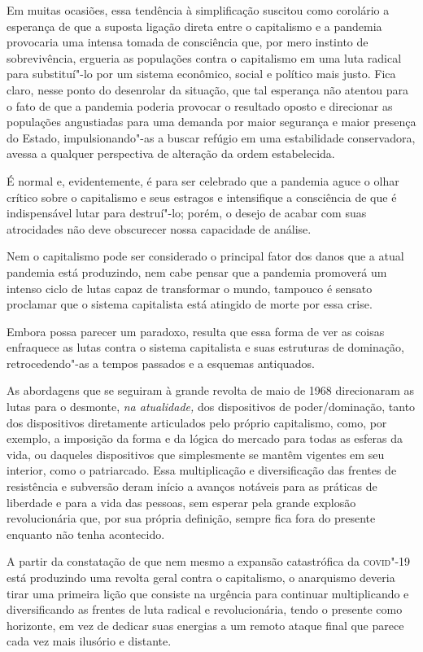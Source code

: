 Em muitas ocasiões, essa tendência à simplificação suscitou como
corolário a esperança de que a suposta ligação direta entre o
capitalismo e a pandemia provocaria uma intensa tomada de consciência
que, por mero instinto de sobrevivência, ergueria as populações contra o
capitalismo em uma luta radical para substituí"-lo por um sistema
econômico, social e político mais justo. Fica claro, nesse ponto do
desenrolar da situação, que tal esperança não atentou para o fato de que
a pandemia poderia provocar o resultado oposto e direcionar as
populações angustiadas para uma demanda por maior segurança e maior
presença do Estado, impulsionando"-as a buscar refúgio em uma
estabilidade conservadora, avessa a qualquer perspectiva de alteração da
ordem estabelecida.

É normal e, evidentemente, é para ser celebrado que a pandemia aguce o
olhar crítico sobre o capitalismo e seus estragos e intensifique a
consciência de que é indispensável lutar para destruí"-lo; porém, o
desejo de acabar com suas atrocidades não deve obscurecer nossa
capacidade de análise.

Nem o capitalismo pode ser considerado o principal fator dos danos que a
atual pandemia está produzindo, nem cabe pensar que a pandemia promoverá
um intenso ciclo de lutas capaz de transformar o mundo, tampouco é
sensato proclamar que o sistema capitalista está atingido de morte por
essa crise.

Embora possa parecer um paradoxo, resulta que essa forma de ver as
coisas enfraquece as lutas contra o sistema capitalista e suas
estruturas de dominação, retrocedendo"-as a tempos passados e a esquemas
antiquados.

As abordagens que se seguiram à grande revolta de maio de 1968
direcionaram as lutas para o desmonte, \textit{na atualidade,} dos
dispositivos de poder/dominação, tanto dos dispositivos diretamente
articulados pelo próprio capitalismo, como, por exemplo, a imposição da
forma e da lógica do mercado para todas as esferas da vida, ou daqueles
dispositivos que simplesmente se mantêm vigentes em seu interior, como o
patriarcado. Essa multiplicação e diversificação das frentes de
resistência e subversão deram início a avanços notáveis para as práticas
de liberdade e para a vida das pessoas, sem esperar pela grande explosão
revolucionária que, por sua própria definição, sempre fica fora do
presente enquanto não tenha acontecido.

A partir da constatação de que nem mesmo a expansão catastrófica da
\textsc{covid}"-19 está produzindo uma revolta geral contra o capitalismo, o
anarquismo deveria tirar uma primeira lição que
consiste na urgência para
continuar multiplicando e diversificando as frentes de luta radical e
revolucionária, tendo o presente como horizonte, em vez de dedicar suas
energias a um remoto ataque final que parece cada vez mais ilusório e
distante.

